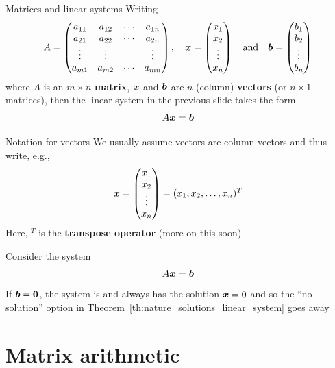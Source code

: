 \documentclass[aspectratio=169]{beamer}\usepackage[]{graphicx}\usepackage[]{xcolor}
\begin{document}
\begin{frame}{Matrices and linear systems}
Writing
\[
A=
\begin{pmatrix}
a_{11} & a_{12} & \cdots & a_{1n} \\
a_{21} & a_{22} & \cdots & a_{2n} \\
\vdots &\vdots & & \vdots \\
a_{m1} & a_{m2} & \cdots & a_{mn}
\end{pmatrix},\quad
\bm{x}=
\begin{pmatrix}
x_1\\ x_2 \\ \vdots \\ x_n
\end{pmatrix}
\quad\textrm{and}\quad
\bm{b}=
\begin{pmatrix}
b_1\\ b_2 \\ \vdots \\ b_n
\end{pmatrix}
\]
where $A$ is an $m\times n$ \textbf{matrix}, $\bm{x}$ and $\bm{b}$ are $n$ (column) \textbf{vectors} (or $n\times 1$ matrices), then the linear system in the previous slide takes the form
\[
A\bm{x}=\bm{b}
\]
\end{frame}



\begin{frame}{Notation for vectors}
We usually assume vectors are column vectors and thus write, e.g.,
\[ 
\bm{x}=
\begin{pmatrix}
x_1\\ x_2 \\ \vdots \\ x_n
\end{pmatrix}
= (x_1,x_2,\ldots,x_n)^T
\]
Here, $^T$ is the \textbf{transpose operator} (more on this soon)
\end{frame}



\begin{frame}
Consider the system
\[
A\bm{x}=\bm{b}
\]
\vfill
If $\bb=\b0$, the system is  and always has the solution $\bm{x}=0$ and so the ``no solution'' option in Theorem~\ref{th:nature_solutions_linear_system} goes away
\end{frame}


\section{Matrix arithmetic}
\end{document}
